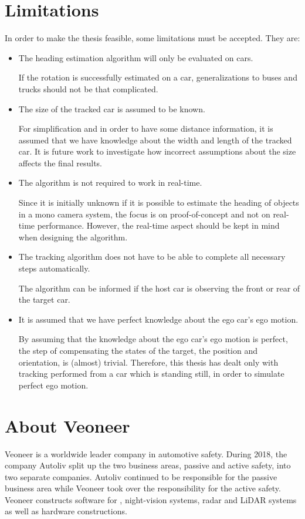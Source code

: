 \section{Limitations}
In order to make the thesis feasible, some limitations must be accepted. They are:

\begin{itemize}	
	\item The heading estimation algorithm will only be evaluated on cars.

	If the rotation is successfully estimated on a car, generalizations to \eg buses and trucks should not be that complicated.

	\item The size of the tracked car is assumed to be known.

	For simplification and in order to have some  distance information, it is assumed that we have knowledge about the width and length of the tracked car.
	It is future work to investigate how incorrect assumptions about the size affects the final results.

	\item The algorithm is not required to work in real-time.

	Since it is initially unknown if it is possible to estimate the heading of objects in a mono camera system, the focus is on proof-of-concept and not on real-time performance.
	However, the real-time aspect should be kept in mind when designing the algorithm.

    \item The tracking algorithm does not have to be able to complete all necessary steps automatically.

    The algorithm can \eg be informed if the host car is observing the front or rear of the target car.

	\item It is assumed that we have perfect knowledge about the ego car's ego motion.

	By assuming that the knowledge about the ego car's ego motion is perfect, the step of compensating the states of the target, \ie the position and orientation, is (almost) trivial.
	Therefore, this thesis has dealt only with tracking performed from a car which is standing still, in order to simulate perfect ego motion.
\end{itemize}

\newpage

\section{About Veoneer}
Veoneer is a worldwide leader company in automotive safety.
During 2018, the company Autoliv split up the two business areas, passive and active safety, into two separate companies.
Autoliv continued to be responsible for the passive business area while Veoneer took over the responsibility for the active safety.
Veoneer constructs software for \abbrADAS, night-vision systems, radar and LiDAR systems as well as hardware constructions.
\cite{Veoneer:2018}

